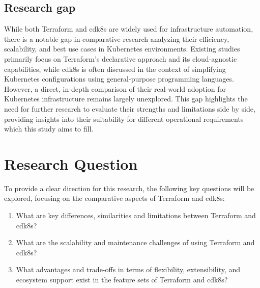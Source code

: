 \documentclass{article}
\begin{document}
\subsection{Research gap}
\label{sec:researchgap}

While both Terraform and cdk8s are widely used for infrastructure automation, there is a notable gap in comparative research analyzing their efficiency, scalability, and best use cases in Kubernetes environments. Existing studies primarily focus on Terraform’s declarative approach and its cloud-agnostic capabilities, while cdk8s is often discussed in the context of simplifying Kubernetes configurations using general-purpose programming languages. However, a direct, in-depth comparison of their real-world adoption for Kubernetes infrastructure remains largely unexplored. This gap highlights the need for further research to evaluate their strengths and limitations side by side, providing insights into their suitability for different operational requirements which this study aims to fill.

\section{Research Question}
\label{sec:research_question}

To provide a clear direction for this research, the following key questions will be explored, focusing on the comparative aspects of Terraform and cdk8s:

\begin{enumerate}[label={\textbf{RQ\theenumi}},leftmargin=1.5cm]
\item What are key differences, similarities and limitations between Terraform and cdk8s?
\item What are the scalability and maintenance challenges of using Terraform and cdk8s?
\item What advantages and trade-offs in terms of flexibility, extensibility, and ecosystem support exist in the feature sets of Terraform and cdk8s?
\end{enumerate}
\end{document}
